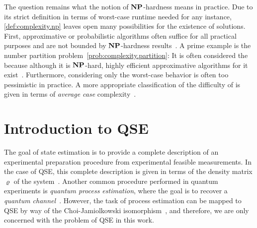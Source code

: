 The question remains what the notion of $\mathbf{NP}$-hardness means in practice.
Due to its strict definition in terms of worst-case runtime needed for any instance, \cref{def:complexity.np} leaves open many possibilities for the existence of  solutions.
First, approximative or probabilistic algorithms often suffice for all practical purposes and are not bounded by $\mathbf{NP}$-hardness results~\cite{Garey_2002_Computers,Arora_2009_Computational}.
A prime example is the number partition problem~\ref{prob:complexity.partition}:
It is often considered the  because although it is $\mathbf{NP}$-hard, highly efficient approximative algorithms for it exist~\cite{Kellerer_1997_Efficient}.
Furthermore, considering only the worst-case behavior is often too pessimistic in practice.
A more appropriate classification of the difficulty of  is given in terms of \emph{average case} complexity~\cite{Arora_2009_Computational}.

\section{Introduction to QSE}
\label{sec:error.intro}

The goal of state estimation is to provide a complete description of an experimental preparation procedure from experimental feasible measurements.
In the case of QSE, this complete description is given in terms of the density matrix $\varrho$ of the system~\cite{Paris_2004_Quantum}.
Another common procedure performed in quantum experiments is \emph{quantum process estimation}, where the goal is to recover a \emph{quantum channel}~\cite{Nielsen_2010_Quantum}.
However, the task of process estimation can be mapped to QSE by way of the Choi-Jamiolkowski isomorphism~\cite{Nielsen_2010_Quantum,Jezek_2003_Quantum,Altepeter_2003_AncillaAssisted}, and therefore, we are only concerned with the problem of QSE in this work.

